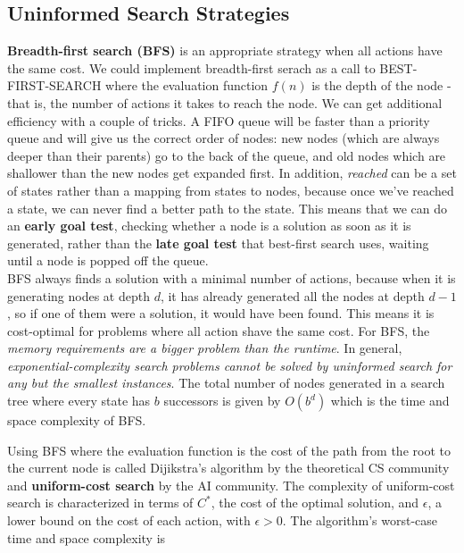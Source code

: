     \subsection{Uninformed Search Strategies}               %

        \textbf{Breadth-first search (BFS)} is an appropriate strategy when all actions have the same cost. We could implement breadth-first serach as a call to BEST-FIRST-SEARCH where the evaluation function $f(n)$ is
        the depth of the node - that is, the number of actions it takes to reach the node. We can get additional efficiency with a couple of tricks. A FIFO queue will be faster than a priority queue and will give us
        the correct order of nodes: new nodes (which are always deeper than their parents) go to the back of the queue, and old nodes which are shallower than the new nodes get expanded first. In addition,
        \textit{reached} can be a set of states rather than a mapping from states to nodes, because once we've reached a state, we can never find a better path to the state. This means that we can do an
        \textbf{early goal test}, checking whether a node is a solution as soon as it is generated, rather than the \textbf{late goal test} that best-first search uses, waiting until a node is popped off the queue. \\

        BFS always finds a solution with a minimal number of actions, because when it is generating nodes at depth $d$, it has already generated all the nodes at depth $d-1$, so if one of them were a solution, it would
        have been found. This means it is cost-optimal for problems where all action shave the same cost. For BFS, the \textit{memory requirements are a bigger problem than the runtime}. In general,
        \textit{exponential-complexity search problems cannot be solved by uninformed search for any but the smallest instances}. The total number of nodes generated in a search tree where every state has $b$ successors
        is given by $O(b^d)$ which is the time and space complexity of BFS.

        Using BFS where the evaluation function is the cost of the path from the root to the current node is called Dijikstra's algorithm by the theoretical CS community and \textbf{uniform-cost search} by the AI
        community. The complexity of uniform-cost search is characterized in terms of $C^*$, the cost of the optimal solution, and $\epsilon$, a lower bound on the cost of each action, with $\epsilon > 0$. The algorithm's
        worst-case time and space complexity is

